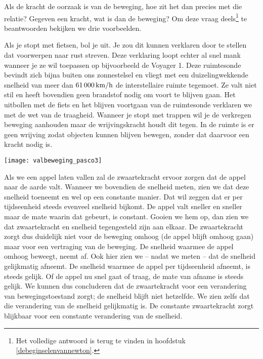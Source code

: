 \documentclass{ximera}
\begin{document}
Als de kracht de oorzaak is van de beweging, hoe zit het dan precies met die relatie? Gegeven een kracht, wat is dan de beweging? Om deze vraag deels\footnote{Het volledige antwoord is terug te vinden in hoofdstuk \ref{debeginselenvannewton}.} te beantwoorden bekijken we drie voorbeelden.

Als je stopt met fietsen, bol je uit. Je zou dit kunnen verklaren door te stellen dat voorwerpen naar rust streven. Deze verklaring loopt echter al snel mank wanneer je ze wil toepassen op bijvoorbeeld de Voyager 1. Deze ruimtesonde bevindt zich bijna buiten ons zonnestelsel en vliegt met een duizelingwekkende snelheid van meer dan $61\,000\rm\,km/h$ de interstellaire ruimte tegemoet. Ze valt niet stil en heeft bovendien geen brandstof nodig om voort te blijven gaan. Het uitbollen met de fiets en het blijven voortgaan van de ruimtesonde verklaren we met de wet van de traagheid. Wanneer je stopt met trappen wil je de verkregen beweging aanhouden maar de wrijvingskracht houdt dit tegen. In de ruimte is er geen wrijving zodat objecten kunnen blijven bewegen, zonder dat daarvoor een kracht nodig is.

\begin{image}
% 
\texttt{[image: valbeweging\_pasco3]}
\end{image}

Als we een appel laten vallen zal de zwaartekracht ervoor zorgen dat de appel naar de aarde valt. Wanneer we bovendien de snelheid meten, zien we dat deze snelheid toeneemt en wel op een constante manier. Dat wil zeggen dat er per tijdseenheid steeds evenveel snelheid bijkomt. De appel valt sneller en sneller maar de mate waarin dat gebeurt, is constant. Gooien we hem op, dan zien we dat zwaartekracht en snelheid tegengesteld zijn aan elkaar. De zwaartekracht zorgt dus duidelijk niet voor de beweging omhoog (de appel blijft omhoog gaan) maar voor een vertraging van de beweging. De snelheid waarmee de appel omhoog beweegt, neemt af. Ook hier zien we -- nadat we meten -- dat de snelheid gelijkmatig afneemt. De snelheid waarmee de appel per tijdseenheid afneemt, is steeds gelijk. Of de appel nu snel gaat of traag, de mate van afname is steeds gelijk. We kunnen dus concluderen dat de zwaartekracht voor een verandering van bewegingstoestand zorgt; de snelheid blijft niet hetzelfde. We zien zelfs dat die verandering van de snelheid gelijkmatig is. De constante zwaartekracht zorgt blijkbaar voor een constante verandering van de snelheid. 
\end{document}
